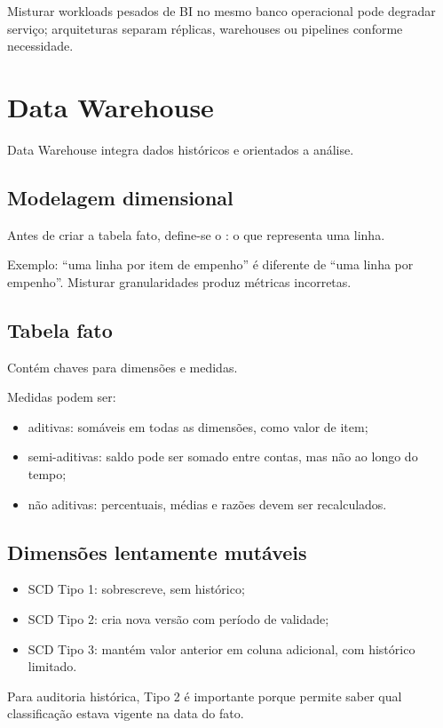 Misturar workloads pesados de BI no mesmo banco operacional pode degradar serviço; arquiteturas separam réplicas, warehouses ou pipelines conforme necessidade.

\section{Data Warehouse}

Data Warehouse integra dados históricos e orientados a análise.

\subsection{Modelagem dimensional}

Antes de criar a tabela fato, define-se o : o que representa uma linha.

Exemplo: ``uma linha por item de empenho'' é diferente de ``uma linha por empenho''. Misturar granularidades produz métricas incorretas.

\subsection{Tabela fato}

Contém chaves para dimensões e medidas.

Medidas podem ser:
\begin{itemize}
\item aditivas: somáveis em todas as dimensões, como valor de item;
\item semi-aditivas: saldo pode ser somado entre contas, mas não ao longo do tempo;
\item não aditivas: percentuais, médias e razões devem ser recalculados.
\end{itemize}

\subsection{Dimensões lentamente mutáveis}

\begin{itemize}
\item SCD Tipo 1: sobrescreve, sem histórico;
\item SCD Tipo 2: cria nova versão com período de validade;
\item SCD Tipo 3: mantém valor anterior em coluna adicional, com histórico limitado.
\end{itemize}

Para auditoria histórica, Tipo 2 é importante porque permite saber qual classificação estava vigente na data do fato.

